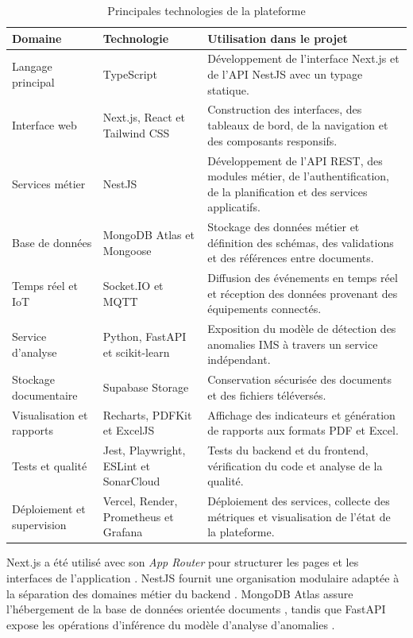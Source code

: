 \begin{table}[H]
\centering
\caption{Principales technologies de la plateforme}
\label{tab:technologies}
\small
\begin{tabularx}{\textwidth}{|p{3.4cm}|p{3.2cm}|X|}
\hline
\textbf{Domaine} & \textbf{Technologie} & \textbf{Utilisation dans le projet} \\
\hline
Langage principal & TypeScript & Développement de l’interface Next.js et de l’API NestJS avec un typage statique. \\
\hline
Interface web & Next.js, React et Tailwind CSS & Construction des interfaces, des tableaux de bord, de la navigation et des composants responsifs. \\
\hline
Services métier & NestJS & Développement de l’API REST, des modules métier, de l’authentification, de la planification et des services applicatifs. \\
\hline
Base de données & MongoDB Atlas et Mongoose & Stockage des données métier et définition des schémas, des validations et des références entre documents. \\
\hline
Temps réel et IoT & Socket.IO et MQTT & Diffusion des événements en temps réel et réception des données provenant des équipements connectés. \\
\hline
Service d’analyse & Python, FastAPI et scikit-learn & Exposition du modèle de détection des anomalies IMS à travers un service indépendant. \\
\hline
Stockage documentaire & Supabase Storage & Conservation sécurisée des documents et des fichiers téléversés. \\
\hline
Visualisation et rapports & Recharts, PDFKit et ExcelJS & Affichage des indicateurs et génération de rapports aux formats PDF et Excel. \\
\hline
Tests et qualité & Jest, Playwright, ESLint et SonarCloud & Tests du backend et du frontend, vérification du code et analyse de la qualité. \\
\hline
Déploiement et supervision & Vercel, Render, Prometheus et Grafana & Déploiement des services, collecte des métriques et visualisation de l’état de la plateforme. \\
\hline
\end{tabularx}
\end{table}

Next.js a été utilisé avec son \textit{App Router} pour structurer les pages et les interfaces de l’application \cite{nextjs_docs}. NestJS fournit une organisation modulaire adaptée à la séparation des domaines métier du backend \cite{nestjs_docs}. MongoDB Atlas assure l’hébergement de la base de données orientée documents \cite{mongodb_atlas_docs}, tandis que FastAPI expose les opérations d’inférence du modèle d’analyse d’anomalies \cite{fastapi_docs}.

